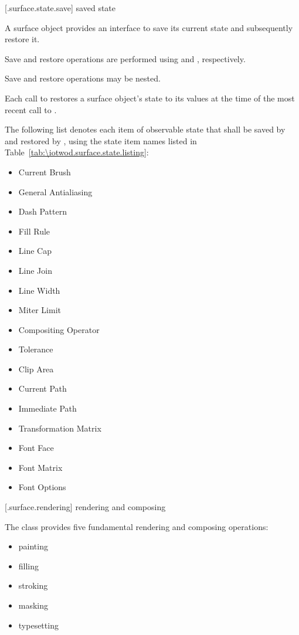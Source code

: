  [\iotwod.surface.state.save] { saved state}

\pnum
A surface object provides an interface to save its current state and subsequently restore it.

\pnum
Save and restore operations are performed using  and , respectively.

\pnum
Save and restore operations may be nested.

\pnum
Each call to  restores a surface object's state to its values at the time of the most recent call to .

\pnum
The following list denotes each item of observable state that shall be saved by  and restored by , using the state item names listed in Table~\ref{tab:\iotwod.surface.state.listing}:

\begin{itemize}
	\item Current Brush
	\item General Antialiasing
	\item Dash Pattern
	\item Fill Rule
	\item Line Cap
	\item Line Join
	\item Line Width
	\item Miter Limit
	\item Compositing Operator
	\item Tolerance
	\item Clip Area
	\item Current Path
	\item Immediate Path
	\item Transformation Matrix
	\item Font Face
	\item Font Matrix
	\item Font Options
\end{itemize}

 [\iotwod.surface.rendering] { rendering and composing}

\pnum
The  class provides five fundamental rendering and composing operations:
\begin{itemize}
\item painting
\item filling
\item stroking
\item masking
\item typesetting
\end{itemize}

